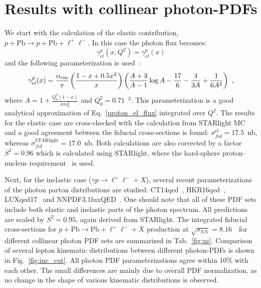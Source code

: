 \section{Results with collinear photon-PDFs}

We start with the calculation of the elastic contribution, $p+\textrm{Pb}\rightarrow p+\textrm{Pb}+ \ell^+\ell^-$.
In this case the photon flux becomes:
\begin{equation}
\gamma^{p}_{el}(x, Q^2) = \gamma^{p}_{el}(x) 
\end{equation}
and the following parameterization is used~\cite{Budnev:1974de}:
\begin{equation}
\gamma^{p}_{el}(x)  = \frac{\alpha_{\rm em}}{\pi}
\left(
\frac{1-x+0.5x^2}{x}
\right)
\left(
\frac{A+3}{A-1}\log{A}-\frac{17}{6}-\frac{4}{3A}+\frac{1}{6A^2}
\right)~,
\end{equation}
where $A = 1+\frac{Q_0^2(1-x)}{x m_p^2}$ and $Q_0^2 = 0.71$~\GeV$^2$. This parameterization is a good analytical approximation of Eq.~\ref{proton_el_flux} integrated over $Q^2$.
The results for the elastic case are cross-checked with the calculation from STARlight MC and a good agreement between the fiducial cross-sections is found:
$\sigma_{fid}^{\textrm{el}} = 17.5$~nb, whereas $\sigma_{fid}^{\textrm{STARlight}} = 17.0$~nb.
Both calculations are also corrected by a factor $S^2=0.96$ which 
is calculated using STARlight, where the hard-sphere proton--nucleus requirement~\cite{Klein:2016yzr} is used.

Next, for the inelastic case ($\gamma p\rightarrow \ell^+\ell^- + X$), several recent parameterizations of the photon parton distributions are studied: CT14qed~\cite{Schmidt:2015zda}, HKR16qed~\cite{Harland-Lang:2016kog}, LUXqed17~\cite{Manohar:2017eqh} and NNPDF3.1luxQED~\cite{Bertone:2017bme}. 
One should note that all of these PDF sets include both elastic and inelastic parts of the photon spectrum.
All predictions are scaled by $S^2=0.95$, again derived from STARlight.
The integrated fiducial cross-sections for $p+\textrm{Pb}\rightarrow \textrm{Pb} + \ell^+\ell^- + X$ production at $\sqrt{s_{N N}} = 8.16$~\TeV\ for different collinear photon PDF sets are summarized in Tab.~\ref{fig:xs}.
Comparison of several lepton kinematic distributions between different photon-PDFs is shown in Fig.~\ref{fig:inc_cut}.
All photon PDF parameterizations agree within 10\% with each other.
The small differences are mainly due to overall PDF normalization, as no change in the shape of various kinematic distributions is observed.

